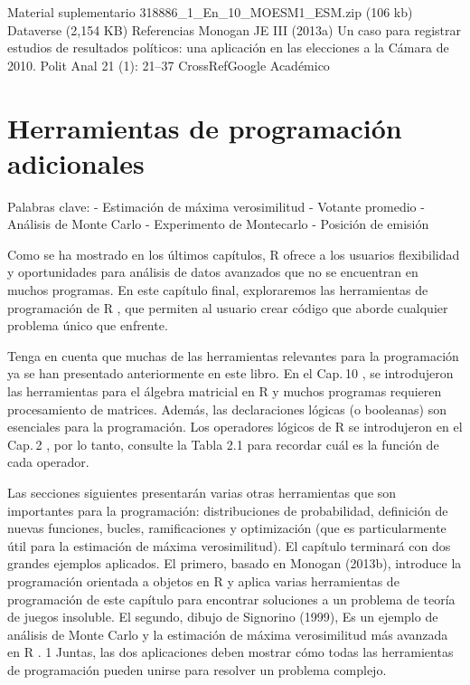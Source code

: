 \documentclass[
]{book}
\begin{document}
Material suplementario
318886\_1\_En\_10\_MOESM1\_ESM.zip (106 kb)
Dataverse (2,154 KB)
Referencias
Monogan JE III (2013a) Un caso para registrar estudios de resultados políticos: una aplicación en las elecciones a la Cámara de 2010. Polit Anal 21 (1): 21--37
CrossRefGoogle Académico

\hypertarget{Herramientasdeprogramaciuxf3nadicionales}{%
\chapter{Herramientas de programación adicionales}\label{Herramientasdeprogramaciuxf3nadicionales}}

Palabras clave:
- Estimación de máxima verosimilitud
- Votante promedio
- Análisis de Monte Carlo
- Experimento de Montecarlo
- Posición de emisión

Como se ha mostrado en los últimos capítulos, R ofrece a los usuarios flexibilidad y oportunidades para análisis de datos avanzados que no se encuentran en muchos programas. En este capítulo final, exploraremos las herramientas de programación de R , que permiten al usuario crear código que aborde cualquier problema único que enfrente.

Tenga en cuenta que muchas de las herramientas relevantes para la programación ya se han presentado anteriormente en este libro. En el Cap. 10 , se introdujeron las herramientas para el álgebra matricial en R y muchos programas requieren procesamiento de matrices. Además, las declaraciones lógicas (o booleanas) son esenciales para la programación. Los operadores lógicos de R se introdujeron en el Cap. 2 , por lo tanto, consulte la Tabla 2.1 para recordar cuál es la función de cada operador.

Las secciones siguientes presentarán varias otras herramientas que son importantes para la programación: distribuciones de probabilidad, definición de nuevas funciones, bucles, ramificaciones y optimización (que es particularmente útil para la estimación de máxima verosimilitud). El capítulo terminará con dos grandes ejemplos aplicados. El primero, basado en Monogan (2013b), introduce la programación orientada a objetos en R y aplica varias herramientas de programación de este capítulo para encontrar soluciones a un problema de teoría de juegos insoluble. El segundo, dibujo de Signorino (1999), Es un ejemplo de análisis de Monte Carlo y la estimación de máxima verosimilitud más avanzada en R . 1 Juntas, las dos aplicaciones deben mostrar cómo todas las herramientas de programación pueden unirse para resolver un problema complejo.
\end{document}
